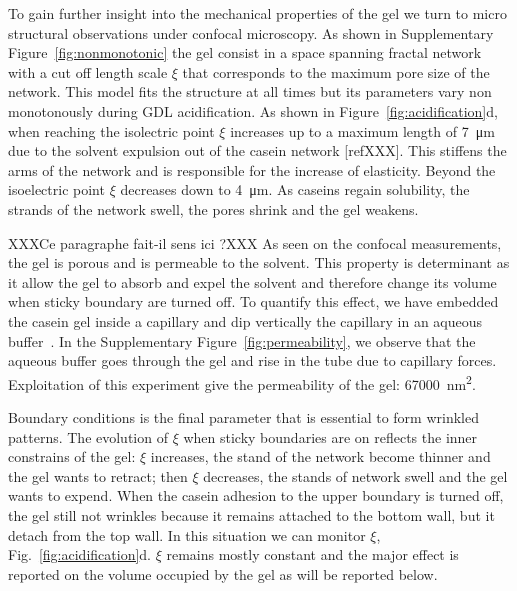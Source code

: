 \documentclass[twocolumn,superscriptaddress,showpacs,preprintnumbers,
amsmath,amssymb,prl]{revtex4-1}
\begin{document}
To gain further insight into the mechanical properties of the gel we turn to micro structural observations under confocal microscopy. As shown in Supplementary Figure~\ref{fig:nonmonotonic} the gel consist in a space spanning fractal network with a cut off length scale $\xi$ that corresponds to the maximum pore size of the network. This model fits the structure at all times but its parameters vary non monotonously during GDL acidification. As shown in Figure~\ref{fig:acidification}d, when reaching the isolectric point $\xi$ increases up to a maximum length of \SI{7}{\micro\metre} due to the solvent expulsion out of the casein network [refXXX]. This stiffens the arms of the network and is responsible for the increase of elasticity. Beyond the isoelectric point $\xi$ decreases down to \SI{4}{\micro\metre}. As caseins regain solubility, the strands of the network swell, the pores shrink and the gel weakens.

XXXCe paragraphe fait-il sens ici ?XXX As seen on the confocal measurements, the gel is porous and is permeable to the solvent.  This property is determinant as it allow the gel to absorb and expel the solvent and therefore change its volume when sticky boundary are turned off. To quantify this effect, we have embedded the casein gel inside a capillary and dip vertically the capillary in an aqueous buffer~\cite{VanDijk1986}. In the Supplementary Figure~\ref{fig:permeability}, we observe that the aqueous buffer goes through the gel and rise in the tube due to capillary forces. Exploitation of this experiment give the permeability of the gel: \SI{67000}{\square\nano\metre}.

Boundary conditions is the final parameter that is essential to form wrinkled patterns. The evolution of $\xi$ when sticky boundaries are on reflects the inner constrains of the gel:  $\xi$ increases, the stand of the network become thinner and the gel wants to retract; then $\xi$ decreases, the stands of network swell and the gel wants to expend. When the casein adhesion to the upper boundary is turned off, the gel still not wrinkles because it remains attached to the bottom wall, but it detach from the top wall. In this situation we can monitor $\xi$, Fig.~\ref{fig:acidification}d. $\xi$ remains mostly constant and the major effect is reported on the volume occupied by the gel as will be reported below.


\end{document}
